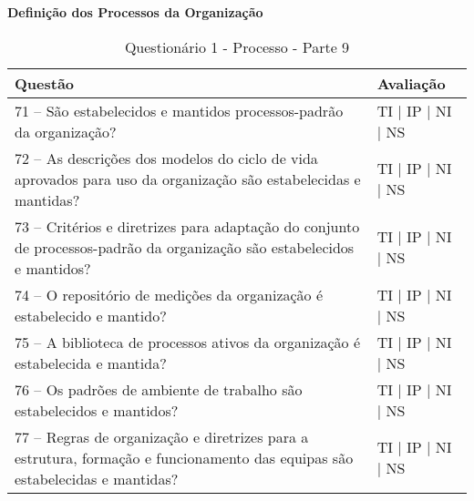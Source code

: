 \documentclass[openany,10pt,a4paper]{article}
\begin{document}
\begin{appendix}
\begin{table}[h]
\textbf{Definição dos Processos da Organização}
	\centering
	\caption{Questionário 1 - Processo - Parte 9}
	\begin{tabular}{p{3.5in}p{2in}}		
		\toprule
		\textbf{Questão}  & \textbf{Avaliação}\\ 
		\midrule
		71 – São estabelecidos e mantidos processos-padrão da organização?
 & TI | IP | NI | NS \\
        \midrule
		72 – As descrições dos modelos do ciclo de vida aprovados para uso da organização são 
estabelecidas e mantidas?
 & TI | IP | NI | NS \\
		\midrule
		73 – Critérios e diretrizes para adaptação do conjunto de processos-padrão da organização são 
estabelecidos e mantidos?
 & TI | IP | NI | NS \\
		\midrule
        74 – O repositório de medições da organização é estabelecido e mantido?
 & TI | IP | NI | NS \\
		\midrule
		75 – A biblioteca de processos ativos da organização é estabelecida e mantida?
  & TI | IP | NI | NS \\
		\midrule
		76 – Os padrões de ambiente de trabalho são estabelecidos e mantidos?
 & TI | IP | NI | NS \\
        \midrule
        77 – Regras de organização e diretrizes para a estrutura, formação e funcionamento das equipas 
são estabelecidas e mantidas?
& TI | IP | NI | NS \\
		\bottomrule
	\end{tabular} 
	\label{tab:tabela1}
\end{table}


\end{appendix}
\end{document}
